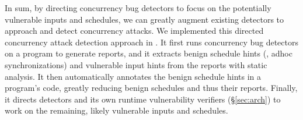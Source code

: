 






In sum, by directing concurrency bug detectors to focus on the 
potentially vulnerable inputs and schedules, we can greatly 
augment existing detectors to approach and detect concurrency attacks. 
We implemented this directed concurrency attack detection approach in \xxx. It 
first runs concurrency bug detectors on a program to generate reports, and it
extracts benign schedule hints (\eg, adhoc synchronizations) and 
vulnerable input hints from the reports with static analysis. It then 
automatically annotates the benign schedule hints in a program's code, greatly 
reducing benign schedules and thus their reports. Finally, it directs detectors 
and its own runtime vulnerability verifiers (\S\ref{sec:arch}) to work on 
the remaining, likely vulnerable inputs and schedules.

